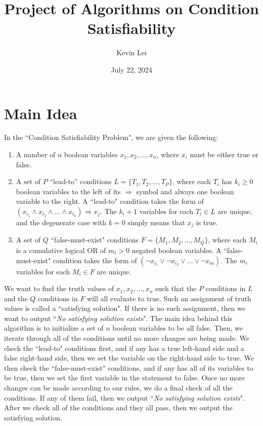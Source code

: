 \documentclass{article}
\title{Project of Algorithms on Condition Satisfiability}
\author{Kevin Lei}
\date{July 22, 2024}
\begin{document}
\maketitle

\section{Main Idea}

In the ``Condition Satisfiability Problem", we are given the following:
\begin{enumerate}
    \item A number of $n$ boolean variables $x_1, x_2, \ldots, x_n$, where $x_i$ must be either true or false.
    \item A set of $P$ ``lead-to'' conditions $L = \{T_1, T_2, \ldots, T_P\}$, where each $T_i$ has $k_i \geq 0$ boolean variables to the left of its $\Rightarrow$ symbol and always one boolean variable to the right.
    A ``lead-to" condition takes the form of $(x_{i_1} \land x_{i_2} \land \ldots \land x_{i_k}) \Rightarrow x_j$.
    The $k_i + 1$ variables for each $T_i \in L$ are unique, and the degenerate case with $k=0$ simply means that $x_j$ is true.
    \item A set of $Q$ ``false-must-exist" conditions $F = \{M_1, M_2, \ldots, M_Q\}$, where each $M_i$ is a cumulative logical OR of $m_i > 0$ negated boolean variables.
    A ``false-must-exist" condition takes the form of $(\neg x_{i_1} \lor \neg x_{i_2} \lor \ldots \lor \neg x_{m})$.
    The $m_i$ variables for each $M_i \in F$ are unique.
\end{enumerate}

We want to find the truth values of $x_1, x_2, \ldots, x_n$ such that the $P$ conditions in $L$ and the $Q$ conditions in $F$ will all evaluate to true.
Such an assignment of truth values is called a ``satisfying solution".
If there is no such assignment, then we want to output ``\textit{No satisfying solution exists}".
\vspace{1em}
\newline\noindent
The main idea behind this algorithm is to initialize a set of $n$ boolean variables to be all false.
Then, we iterate through all of the conditions until no more changes are being made.
We check the ``lead-to" conditions first, and if any has a true left-hand side and a false right-hand side, then we set the variable on the right-hand side to true.
We then check the ``false-must-exist" conditions, and if any has all of its variables to be true, then we set the first variable in the statement to false.
Once no more changes can be made according to our rules, we do a final check of all the conditions.
If any of them fail, then we output ``\textit{No satisfying solution exists}".
After we check all of the conditions and they all pass, then we output the satisfying solution.
\end{document}
